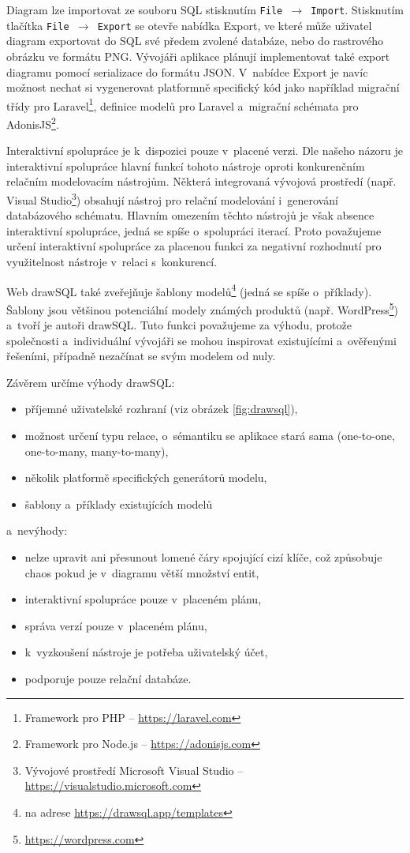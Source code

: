 Diagram lze importovat ze souboru SQL stisknutím \texttt{File $\rightarrow$
Import}. Stisknutím tlačítka \texttt{File $\rightarrow$ Export} se otevře
nabídka Export, ve které může uživatel diagram exportovat do SQL své předem
zvolené databáze, nebo do rastrového obrázku ve formátu PNG. Vývojáři aplikace
plánují implementovat také export diagramu pomocí serializace do formátu JSON.
V~nabídce Export je navíc možnost nechat si vygenerovat platformně specifický
kód jako například migrační třídy pro Laravel\footnote{Framework pro PHP --
\url{https://laravel.com}}, definice modelů pro Laravel a~migrační schémata pro
AdonisJS\footnote{Framework pro Node.js -- \url{https://adonisjs.com}}.

Interaktivní spolupráce je k~dispozici pouze v~placené verzi. Dle našeho názoru
je interaktivní spolupráce hlavní funkcí tohoto nástroje oproti konkurenčním
relačním modelovacím nástrojům. Některá integrovaná vývojová prostředí (např.
Visual Studio\footnote{Vývojové prostředí Microsoft Visual Studio --
\url{https://visualstudio.microsoft.com}}) obsahují nástroj pro relační
modelování i~generování databázového schématu. Hlavním omezením těchto nástrojů
je však absence interaktivní spolupráce, jedná se spíše o~spolupráci iterací.
Proto považujeme určení interaktivní spolupráce za placenou funkci za negativní
rozhodnutí pro využitelnost nástroje v~relaci s~konkurencí.

Web drawSQL také zveřejňuje šablony modelů\footnote{na adrese
\url{https://drawsql.app/templates}} (jedná se spíše o~příklady). Šablony jsou
většinou potenciální modely známých produktů (např.
WordPress\footnote{\url{https://wordpress.com}}) a~tvoří je autoři drawSQL.
Tuto funkci považujeme za výhodu, protože společnosti a~individuální vývojáři se
mohou inspirovat existujícími a~ověřenými řešeními, případně nezačínat se svým
modelem od nuly.

Závěrem určíme výhody drawSQL:
\begin{itemize}
  \item příjemné uživatelské rozhraní (viz obrázek \ref{fig:drawsql}),
  \item možnost určení typu relace, o~sémantiku se aplikace stará sama
  (one-to-one, one-to-many, many-to-many),
  \item několik platformě specifických generátorů modelu,
  \item šablony a~příklady existujících modelů
\end{itemize}
a~nevýhody:
\begin{itemize}
  \item nelze upravit ani přesunout lomené čáry spojující cizí klíče, což
  způsobuje chaos pokud je v~diagramu větší množství entit,
  \item interaktivní spolupráce pouze v~placeném plánu,
  \item správa verzí pouze v~placeném plánu,
  \item k~vyzkoušení nástroje je potřeba uživatelský účet,
  \item podporuje pouze relační databáze.
\end{itemize}

